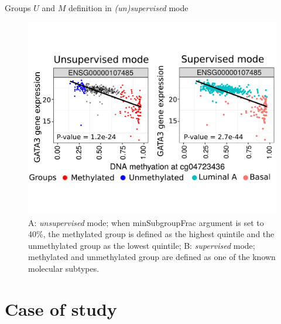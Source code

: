 \documentclass[slidestop,compress,11pt,xcolor=dvipsnames]{beamer}
\begin{document}
\begin{frame}{\normalsize{Groups $U$ and $M$ definition in \textit{(un)supervised} mode}} 

 \vspace*{-0.3cm}
 \begin{figure}
 \centering
  \includegraphics[width=1.0\linewidth]{ELMER/painel_mode.pdf}
  \scriptsize{\caption{ A:  \textit{unsupervised} mode; when minSubgroupFrac argument is set to 40\%, the methylated group is defined as the highest quintile and the unmethylated group as the lowest quintile; B:  \textit{supervised} mode; methylated and unmethylated group are defined as one of the known molecular subtypes.}}
 \end{figure}
\end{frame}

\section{Case of study}
\end{document}
